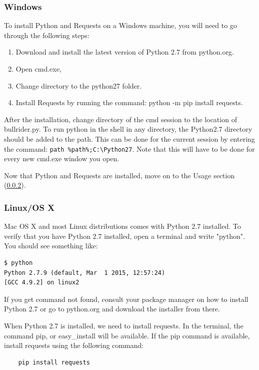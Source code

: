 \subsubsection{Windows}
To install Python and Requests on a Windows machine, you will need to go through the following steps:

\begin{enumerate}
\setlength{\itemsep}{0cm}%
    \item Download and install the latest version of Python 2.7 from python.org.
    \item Open cmd.exe,
    \item Change directory to the python27 folder. 
    \item Install Requests by running the command: python -m pip install requests.
\end{enumerate}

After the installation, change directory of the cmd session to the location of bullrider.py. To run python in the shell in any directory, the Python2.7 directory should be added to the path. This can be done for the current session by entering the command: \verb!path %path%;C:\Python27!.
Note that this will have to be done for every new cmd.exe window you open.

Now that Python and Requests are installed, move on to the Usage section (\ref{}).

\subsubsection{Linux/OS X}
Mac OS X and most Linux distributions comes with Python 2.7 installed. To verify that you have Python 2.7 installed, open a terminal and write "python". You should see something like:
\begin{verbatim}
$ python
Python 2.7.9 (default, Mar  1 2015, 12:57:24)
[GCC 4.9.2] on linux2
\end{verbatim}

If you get command not found, consult your package manager on how to install Python 2.7 or go to python.org and download the installer from there.

When Python 2.7 is installed, we need to install requests. In the terminal, the command pip, or easy\_install will be available. If the pip command is available, install requests using the following command:

\begin{verbatim}
    pip install requests
\end{verbatim}

